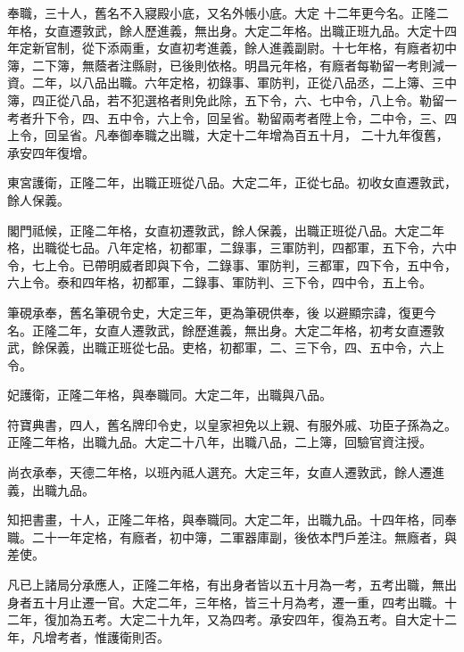 \begin{pinyinscope}
 奉職，三十人，舊名不入寢殿小底，又名外帳小底。大定
 十二年更今名。正隆二年格，女直遷敦武，餘人歷進義，無出身。大定二年格。出職正班九品。大定十四年定新官制，從下添兩重，女直初考進義，餘人進義副尉。十七年格，有廕者初中簿，二下簿，無蔭者注縣尉，已後則依格。明昌元年格，有廕者每勒留一考則減一資。二年，以八品出職。六年定格，初錄事、軍防判，正從八品丞，二上簿、三中簿，四正從八品，若不犯選格者則免此除，五下令，六、七中令，八上令。勒留一考者升下令，四、五中令，六上令，回呈省。勒留兩考者陞上令，二中令，三、四上令，回呈省。凡奉御奉職之出職，大定十二年增為百五十月，
 二十九年復舊，承安四年復增。



 東宮護衛，正隆二年，出職正班從八品。大定二年，正從七品。初收女直遷敦武，餘人保義。



 閣門祗候，正隆二年格，女直初遷敦武，餘人保義，出職正班從八品。大定二年格，出職從七品。八年定格，初都軍，二錄事，三軍防判，四都軍，五下令，六中令，七上令。已帶明威者即與下令，二錄事、軍防判，三都軍，四下令，五中令，六上令。泰和四年格，初都軍，二錄事、軍防判、三下令，四中令，五上令。



 筆硯承奉，舊名筆硯令史，大定三年，更為筆硯供奉，後
 以避顯宗諱，復更今名。正隆二年，女直人遷敦武，餘歷進義，無出身。大定二年格，初考女直遷敦武，餘保義，出職正班從七品。吏格，初都軍，二、三下令，四、五中令，六上令。



 妃護衛，正隆二年格，與奉職同。大定二年，出職與八品。



 符寶典書，四人，舊名牌印令史，以皇家袒免以上親、有服外戚、功臣子孫為之。正隆二年格，出職九品。大定二十八年，出職八品，二上簿，回驗官資注授。



 尚衣承奉，天德二年格，以班內祗人選充。大定三年，女直人遷敦武，餘人遷進義，出職九品。



 知把書畫，十人，正隆二年格，與奉職同。大定二年，出職九品。十四年格，同奉職。二十一年定格，有廕者，初中簿，二軍器庫副，後依本門戶差注。無廕者，與差使。



 凡已上諸局分承應人，正隆二年格，有出身者皆以五十月為一考，五考出職，無出身者五十月止遷一官。大定二年，三年格，皆三十月為考，遷一重，四考出職。十二年，復加為五考。大定二十九年，又為四考。承安四年，復為五考。自大定十二年，凡增考者，惟護衛則否。




\end{pinyinscope}
